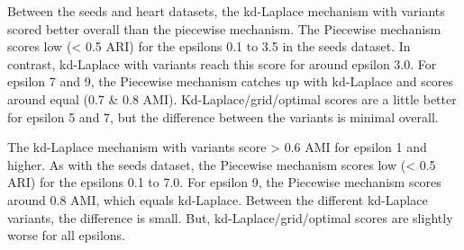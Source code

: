 Between the seeds and heart datasets, the kd-Laplace mechanism with variants scored better overall than the piecewise mechanism.
The Piecewise mechanism scores low (< 0.5 ARI) for the epsilons 0.1 to 3.5 in the seeds dataset.
In contrast, kd-Laplace with variants reach this score for around epsilon 3.0.
For epsilon 7 and 9, the Piecewise mechanism catches up with kd-Laplace and scores around equal (0.7 \& 0.8 AMI).
Kd-Laplace/grid/optimal scores are a little better for epsilon 5 and 7, but the difference between the variants is minimal overall.

The kd-Laplace mechanism with variants score > 0.6 AMI for epsilon 1 and higher.
As with the seeds dataset, the Piecewise mechanism scores low (< 0.5 ARI) for the epsilons 0.1 to 7.0.
For epsilon 9, the Piecewise mechanism scores around 0.8 AMI, which equals kd-Laplace.
Between the different kd-Laplace variants, the difference is small. But, kd-Laplace/grid/optimal scores are slightly worse for all epsilons.

\newpage
